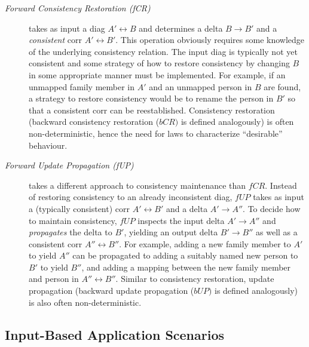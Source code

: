 \begin{description}
\item[\emph{Forward Consistency Restoration (fCR)}] takes as input a diag $A' \leftrightarrow B$ and determines a delta $B \rightarrow B'$ and a \emph{consistent} corr $A' \leftrightarrow B'$.
This operation obviously requires some knowledge of the underlying consistency relation.
The input diag is typically not yet consistent and some strategy of how to restore consistency by changing $B$ in some appropriate manner must be implemented.
For example, if an unmapped family member in $A'$ and an unmapped person in $B$ are found, a strategy to restore consistency would be to rename the person in $B'$ so that a consistent corr can be reestablished.
Consistency restoration (backward consistency restoration ($bCR)$ is defined analogously) is often non-deterministic, hence the need for laws to characterize ``desirable'' behaviour.

\item[\emph{Forward Update Propagation (fUP)}] takes a different approach to consistency maintenance than $fCR$.
Instead of restoring consistency to an already inconsistent diag, $fUP$ takes as input a (typically consistent) corr $A' \leftrightarrow B'$ and a delta $A' \rightarrow A''$.
To decide how to maintain consistency, $fUP$ inspects the input delta $A' \rightarrow A''$ and \emph{propagates} the delta to $B'$, yielding an output delta $B' \rightarrow B''$ as well as a consistent corr $A'' \leftrightarrow B''$.
For example, adding a new family member to $A'$ to yield $A''$ can be propagated to adding a suitably named new person to $B'$ to yield $B''$, and adding a mapping between the new family member and person in $A'' \leftrightarrow B''$.  
Similar to consistency restoration, update propagation (backward update propagation ($bUP)$ is defined analogously) is also often non-deterministic.
\end{description}

\subsection{Input-Based Application Scenarios}
\label{sec:application-scenarios}

